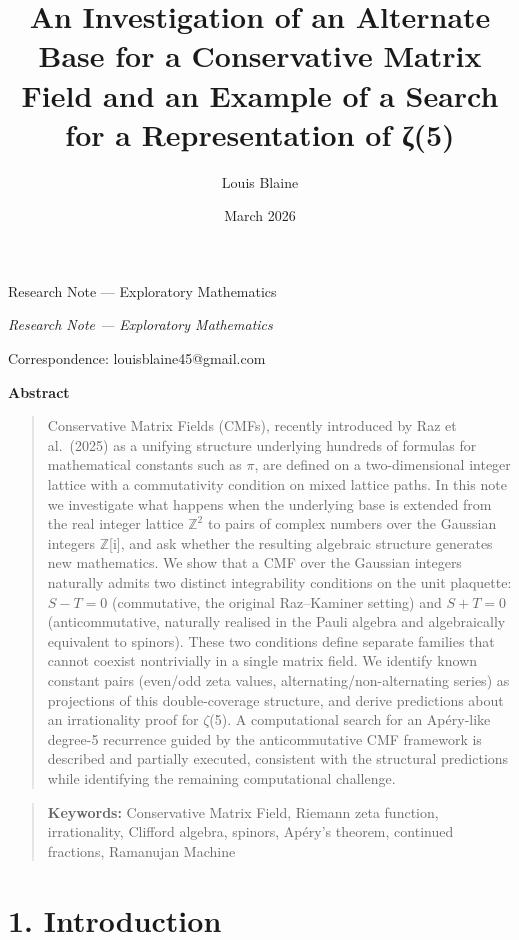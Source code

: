 \documentclass[11pt]{article}
\makeatletter
\renewcommand\maketitle{%
  \begingroup
  \begin{center}
    \LARGE\bfseries \@title \par
  \end{center}
  \ifx\@subtitle\@empty\else
    \vspace{0.4em}
    \begin{center}
      \itshape \@subtitle \par
    \end{center}
  \fi
  \vspace{0.6em}
  \begin{center}
    \@author \par
    \vspace{0.2em}
    Correspondence: \@correspondence \par
    \vspace{0.2em}
    \@date \par
  \end{center}
  \vspace{1em}
  \endgroup
}
\def\@subtitle{}
\newcommand{\subtitleX}[1]{\def\@subtitle{#1}}
\def\@correspondence{}
\newcommand{\correspondenceX}[1]{\def\@correspondence{#1}}
\renewenvironment{abstract}{%
  \begin{center}\bfseries Abstract\end{center}%
  \begin{quote}\setlength{\parindent}{0pt}}{\end{quote}\medskip}
\newcommand{\keywordsX}[1]{%
  \begin{quote}\setlength{\parindent}{0pt}\textbf{Keywords:} #1\end{quote}}
\makeatother
\begin{document}
\title{An Investigation of an Alternate Base for a Conservative Matrix
Field and an Example of a Search for a Representation of ζ(5)}
\subtitleX{Research Note --- Exploratory Mathematics}
\author{Louis Blaine}
\correspondenceX{louisblaine45@gmail.com}
\date{March 2026}

\maketitle

\begin{abstract}
Conservative Matrix Fields (CMFs), recently introduced by Raz et
al.~(2025) as a unifying structure underlying hundreds of formulas for
mathematical constants such as \(\pi\), are defined on a two-dimensional
integer lattice with a commutativity condition on mixed lattice paths.
In this note we investigate what happens when the underlying base is
extended from the real integer lattice \(\mathbb{Z}^{2}\) to pairs of
complex numbers over the Gaussian integers \(\mathbb{Z}\){[}i{]}, and
ask whether the resulting algebraic structure generates new mathematics.
We show that a CMF over the Gaussian integers
naturally admits two distinct integrability conditions on the unit
plaquette: \(S - T = 0\) (commutative, the original Raz--Kaminer
setting) and \(S + T = 0\) (anticommutative, naturally realised in the
Pauli algebra and algebraically equivalent to spinors). These two
conditions define separate families that cannot coexist nontrivially in
a single matrix field. We identify known constant pairs
(even/odd zeta values, alternating/non-alternating series) as
projections of this double-coverage structure, and derive predictions
about an irrationality proof for \(\zeta\)(5). A computational search
for an Apéry-like degree-5 recurrence guided by the anticommutative CMF
framework is described and partially executed, consistent with the
structural predictions while identifying the remaining computational
challenge.
\end{abstract}

\keywordsX{Conservative Matrix Field, Riemann zeta function,
irrationality, Clifford algebra, spinors, Apéry's theorem, continued
fractions, Ramanujan Machine}

\hypertarget{introduction}{%
\section{1. Introduction}\label{introduction}}
\end{document}
